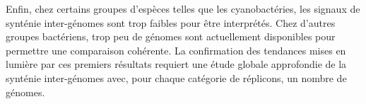 	 Enfin, chez certains groupes d'espèces telles que les cyanobactéries, les signaux de synténie inter-génomes sont trop faibles pour être interprétés. Chez d'autres groupes bactériens, trop peu de génomes sont actuellement disponibles pour permettre une comparaison cohérente. La confirmation des tendances mises en lumière par ces premiers résultats requiert une étude globale approfondie de la synténie inter-génomes avec, pour chaque catégorie de réplicons, un nombre  de génomes.


